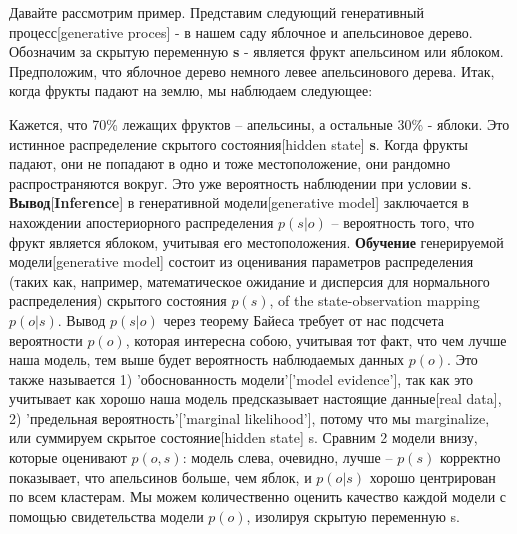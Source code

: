 \documentclass[twoside,leqno, 11pt]{article}
\begin{document}
	Давайте рассмотрим пример. Представим следующий генеративный процесс[generative proces] - в нашем саду яблочное и апельсиновое дерево. Обозначим за скрытую переменную \textbf{s} - является фрукт апельсином или яблоком. Предположим, что яблочное дерево немного левее апельсинового дерева. Итак, когда фрукты падают на землю, мы наблюдаем следующее:

	\begin{figure}[h]
		\label{ris:image}
	\end{figure}
	
	Кажется, что 70\% лежащих фруктов -- апельсины, а остальные 30\% - яблоки. Это истинное распределение скрытого состояния[hidden state] \textbf{s}. Когда фрукты падают, они не попадают в одно и тоже местоположение, они рандомно распространяются вокруг. Это уже вероятность наблюдении при условии \textbf{s}. \textbf{Вывод}[\textbf{Inference}] в генеративной модели[generative model] заключается в нахождении апостериорного распределения $p(s|o)$ -- вероятность того, что фрукт является яблоком, учитывая его местоположения. \textbf{Обучение} генерируемой модели[generative model] состоит из оценивания параметров распределения (таких как, например, математическое ожидание и дисперсия для нормального распределения) скрытого состояния $p(s)$, of the state-observation mapping $p(o|s)$. Вывод $p(s|o)$ через теорему Байеса требует от нас подсчета вероятности $p(o)$, которая интересна собою, учитывая тот факт, что чем лучше наша модель, тем выше будет вероятность наблюдаемых данных $p(o)$. Это также называется 1) 'обоснованность модели'['model evidence'], так как это учитывает как хорошо наша модель предсказывает настоящие данные[real data], 2) 'предельная вероятность'['marginal likelihood'],  потому что мы marginalize, или суммируем скрытое состояние[hidden state] s.
	Сравним 2 модели внизу, которые оценивают $p(o,s)$: модель слева, очевидно, лучше -- $p(s)$ корректно показывает, что апельсинов больше, чем яблок, и $p(o|s)$ хорошо центрирован по всем кластерам. Мы можем количественно оценить качество каждой модели с помощью свидетельства модели $p(o)$, изолируя скрытую переменную s.
	
\end{document}
